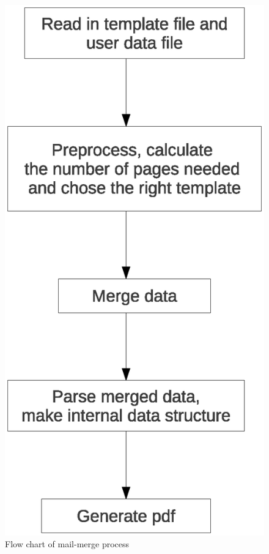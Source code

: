 \documentclass[12pt,twoside,a4paper]{report}
\begin{document}
\begin{figure}[p]
\centering
\includegraphics[scale=0.5]{mailmergeprocess.eps}
\caption{Flow chart of mail-merge process}
\label{fig2}
\end{figure}
\end{document}
